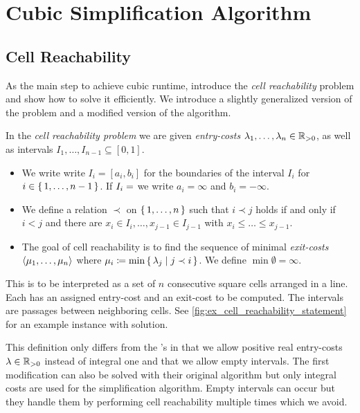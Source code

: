 \section{Cubic Simplification Algorithm}
\label{sec:cubic_algo}


\subsection{Cell Reachability}
\label{ssec:cell_reachability}
As the main step to achieve cubic runtime, \citeauthor{polyline_simplification_has_cubic_complexity_bringmannetal} introduce the \emph{cell reachability} problem and show how to solve it efficiently. We introduce a slightly generalized version of the problem and a modified version of the algorithm. 

\begin{definition}
  In the \emph{cell reachability problem} we are given \emph{entry-costs} \(\lambda_1, \dots, \lambda_n \in \mathbb{R}_{>0}\), as well as intervals \(I_1, \dots, I_{n-1} \subseteq [0, 1]\). 

	\begin{itemize}
		\item We write write \(I_i = [a_i, b_i]\) for the boundaries of the interval \(I_i\) for \(i \in \set{1, \dots, n - 1}\). If \(I_i = \empty\) we write \(a_i = \infty\) and \(b_i = -\infty\).
	  
		\item We define a relation \(\prec\) on \(\set{1, \dots, n}\) such that \(i \prec j\) holds if and only if \(i < j\) and there are \(x_i \in I_i, \dots, x_{j-1} \in I_{j-1}\) with \(x_i \leq \dots \leq x_{j - 1}\).

		\item The goal of cell reachability is to find the sequence of minimal \emph{exit-costs} \(\left\langle\mu_1, \dots, \mu_n\right\rangle\) where \(\mu_i \coloneq \min \set{ \lambda_j \mid j \prec i}\). We define \(\min \emptyset = \infty\).
	\end{itemize}
\end{definition}

This is to be interpreted as a set of \(n\) consecutive square cells arranged in a line. Each has an assigned entry-cost and an exit-cost to be computed. The intervals are passages between neighboring cells. See \cref{fig:ex_cell_reachability_statement} for an example instance with solution.

This definition only differs from the \citeauthor{polyline_simplification_has_cubic_complexity_bringmannetal}'s in that we allow positive real entry-costs \(\lambda \in \mathbb{R}_{>0}\) instead of integral one and that we allow empty intervals. The first modification can also be solved with their original algorithm but only integral costs are used for the simplification algorithm. Empty intervals can occur but they handle them by performing cell reachability multiple times which we avoid. 

